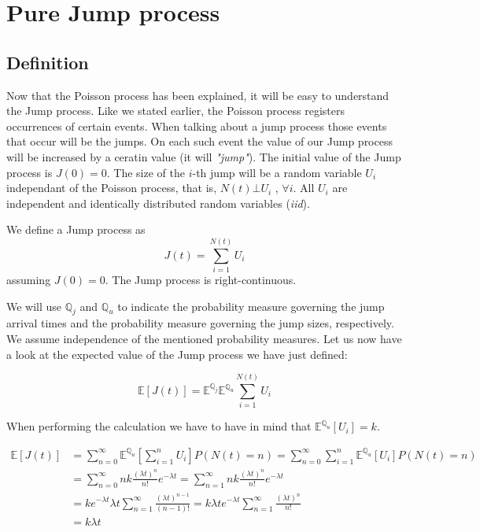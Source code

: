 \documentclass[times, utf8, diplomski]{fer}
\begin{document}
	\section{Pure Jump process}
		\subsection{Definition}
		Now that the Poisson process has been explained, it will be easy to understand the Jump process. Like we stated earlier, the Poisson process registers occurrences of certain events. When talking about a jump process those events that occur will be the jumps. On each such event the value of our Jump process will be increased by a ceratin value (it will \textit{"jump"}). The initial value of the Jump process is $J(0) = 0$. The size of the $i$-th jump will be a random variable $U_i$ independant of the Poisson process, that is, $N(t) \bot U_i$ , $\forall i$. All $U_i$ are independent and identically distributed random variables (\textit{iid}).

		\begin{definition}
			We define a Jump process as 
			\begin{equation}
				J(t) = \sum_{i=1}^{N(t)} U_i
			\end{equation}
			assuming $J(0) = 0$. The Jump process is right-continuous.
		\end{definition}

		We will use $\mathbb{Q}_j$ and $\mathbb{Q}_u$ to indicate the probability measure governing the jump arrival times and the probability measure governing the jump sizes, respectively. We assume independence of the mentioned probability measures. Let us now have a look at the expected value of the Jump process we have just defined:

		\begin{equation} \label{eqn_e_jump} %
		\mathbb{E}[J(t)] = \mathbb{E}^{\mathbb{Q}_j}\mathbb{E}^{\mathbb{Q}_u} \sum_{i=1}^{N(t)} U_i
		\end{equation}

		\noindent When performing the calculation we have to have in mind that $\mathbb{E}^{\mathbb{Q}_u}[U_i] = k$.

		\begin{equation}
		\begin{split}
			\mathbb{E}[J(t)] &= \sum_{n=0}^{\infty}\mathbb{E}^{\mathbb{Q}_u} \left[ \sum_{i=1}^{n} U_i \right] P(N(t)=n) = \sum_{n=0}^{\infty}\sum_{i=1}^{n} \mathbb{E}^{\mathbb{Q}_u}\left[U_i\right] P(N(t)=n) \\
			&= \sum_{n=0}^{\infty} nk\frac{(\lambda t)^n}{n!}e^{-\lambda t} = \sum_{n=1}^{\infty} nk\frac{(\lambda t)^n}{n!}e^{-\lambda t} \\
			&= ke^{-\lambda t}\lambda t\sum_{n=1}^{\infty}\frac{(\lambda t)^{n-1}}{(n-1)!} = k\lambda te^{-\lambda t}\sum_{n=1}^{\infty}\frac{(\lambda t)^n}{n!} \\
			&= k\lambda t
		\end{split}
		\end{equation}
\end{document}
